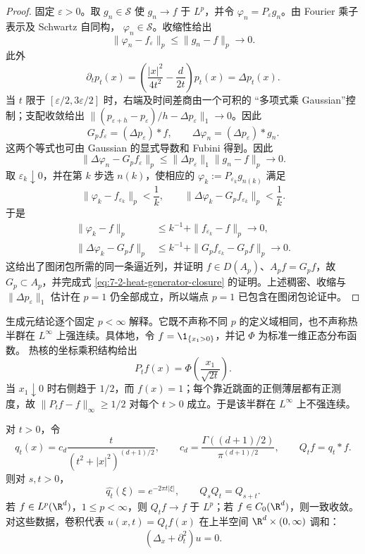 \begin{proof}
固定 $\varepsilon>0$。取 $g_n\in\mathcal S$ 使 $g_n\to f$ 于 $L^p$，并令
$\varphi_n=P_\varepsilon g_n$。由 Fourier 乘子表示及 Schwartz 自同构，
$\varphi_n\in\mathcal S$。收缩性给出
\[
 \|\varphi_n-f_\varepsilon\|_p\leq\|g_n-f\|_p\longrightarrow0.
\]
此外
\[
 \partial_t p_t(x)
 =\left(\frac{|x|^2}{4t^2}-\frac d{2t}\right)p_t(x)
 =\Delta p_t(x).
\]
当 $t$ 限于 $[\varepsilon/2,3\varepsilon/2]$ 时，右端及时间差商由一个可积的
“多项式乘 Gaussian”控制；支配收敛给出
$\|(p_{\varepsilon+h}-p_\varepsilon)/h-\Delta p_\varepsilon\|_1\to0$。因此
\[
 G_pf_\varepsilon=(\Delta p_\varepsilon)*f,
 \qquad
 \Delta\varphi_n=(\Delta p_\varepsilon)*g_n.
\]
这两个等式也可由 Gaussian 的显式导数和 Fubini 得到。因此
\[
 \|\Delta\varphi_n-G_pf_\varepsilon\|_p
 \leq\|\Delta p_\varepsilon\|_1\|g_n-f\|_p\longrightarrow0.
\]
取 $\varepsilon_k\downarrow0$，并在第 $k$ 步选 $n(k)$，使相应的
$\varphi_k:=P_{\varepsilon_k}g_{n(k)}$ 满足
\[
 \|\varphi_k-f_{\varepsilon_k}\|_p<\frac1k,
 \qquad
 \|\Delta\varphi_k-G_pf_{\varepsilon_k}\|_p<\frac1k.
\]
于是
\begin{align*}
 \|\varphi_k-f\|_p
 &\leq k^{-1}+\|f_{\varepsilon_k}-f\|_p\longrightarrow0,\\
 \|\Delta\varphi_k-G_pf\|_p
 &\leq k^{-1}+\|G_pf_{\varepsilon_k}-G_pf\|_p\longrightarrow0.
\end{align*}
这给出了图闭包所需的同一条逼近列，并证明
$f\in D(A_p)$、$A_pf=G_pf$，故 $G_p\subset A_p$，并完成式
\eqref{eq:7-2-heat-generator-closure} 的证明。上述稠密、收缩与
$\|\Delta p_\varepsilon\|_1$ 估计在 $p=1$ 仍全部成立，所以端点 $p=1$ 已包含在图闭包论证中。
\end{proof}

生成元结论逐个固定 $p<\infty$ 解释。它既不声称不同 $p$ 的定义域相同，也不声称热半群在
$L^\infty$ 上强连续。具体地，令 $f=\1_{\{x_1>0\}}$，并记 $\Phi$ 为标准一维正态分布函数。
热核的坐标乘积结构给出
\[
 P_tf(x)=\Phi\!\left(\frac{x_1}{\sqrt{2t}}\right).
\]
当 $x_1\downarrow0$ 时右侧趋于 $1/2$，而 $f(x)=1$；每个靠近跳面的正侧薄层都有正测度，故
$\|P_tf-f\|_\infty\geq1/2$ 对每个 $t>0$ 成立。于是该半群在 $L^\infty$ 上不强连续。

\begin{proposition}\label{proposition:7-2-3-4}
对 $t>0$，令
\[
 q_t(x)=c_d\frac{t}{(t^2+|x|^2)^{(d+1)/2}},
 \qquad
 c_d=\frac{\Gamma((d+1)/2)}{\pi^{(d+1)/2}},
 \qquad Q_tf=q_t*f.
\]
则对 $s,t>0$，
\[
 \widehat{q_t}(\xi)=e^{-2\pi t|\xi|},
 \qquad Q_sQ_t=Q_{s+t}.
\]
若 $f\in L^p(\R^d)$，$1\leq p<\infty$，则
$Q_tf\to f$ 于 $L^p$；若 $f\in C_0(\R^d)$，则一致收敛。对这些数据，卷积代表
$u(x,t)=Q_tf(x)$ 在上半空间 $\R^d\times(0,\infty)$ 调和：
\[
 (\Delta_x+\partial_t^2)u=0.
\]
\end{proposition}

